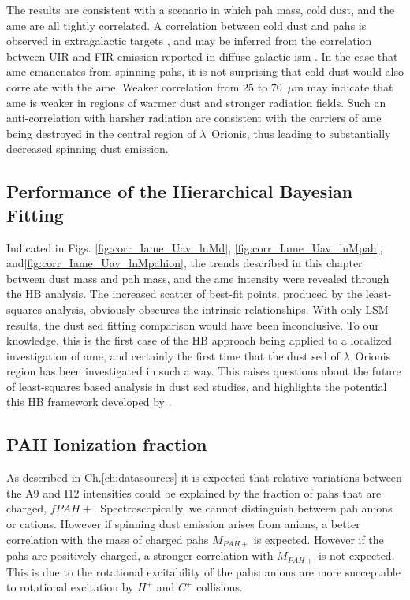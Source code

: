         The results are consistent with a scenario in which \acrshort{pah} mass, cold dust, and the \acrshort{ame} are all tightly correlated. A correlation between cold dust and \acrshort{pah}s is observed in extragalactic targets \citep{haas02}, and may be inferred from the correlation between UIR and FIR emission reported in diffuse galactic \acrshort{ism} \citep{onaka96}. In the case that \acrshort{ame} emanenates from spinning \acrshort{pah}s, it is not surprising that cold dust would also correlate with the \acrshort{ame}. Weaker correlation from 25 to 70~$\mu$m may indicate that \acrshort{ame} is weaker in regions of warmer dust and stronger radiation fields. Such an anti-correlation with harsher radiation are consistent with the carriers of \acrshort{ame} being destroyed in the central region of $\lambda$~Orionis, thus leading to substantially decreased spinning dust emission.

      \subsection{Performance of the Hierarchical Bayesian Fitting}

      Indicated in Figs. \ref{fig:corr_Iame_Uav_lnMd}, \ref{fig:corr_Iame_Uav_lnMpah}, and\ref{fig:corr_Iame_Uav_lnMpahion}, the trends described in this chapter between dust mass and \acrshort{pah} mass, and the \acrshort{ame} intensity were revealed through the HB analysis. The increased scatter of best-fit points, produced by the least-squares analysis, obviously obscures the intrinsic relationships. With only LSM results, the dust \acrshort{sed} fitting comparison would have been inconclusive. To our knowledge, this is the first case of the HB approach being applied to a localized investigation of \acrshort{ame}, and certainly the first time that the dust \acrshort{sed} of $\lambda$~Orionis region has been investigated in such a way. This raises questions about the future of least-squares based analysis in dust \acrshort{sed} studies, and highlights the potential this HB framework developed by \cite{galliano18}.

      \subsection{PAH Ionization fraction}
          As described in Ch.\ref{ch:datasources} it is expected that relative variations between the A9 and I12 intensities could be explained by the fraction of \acrshort{pah}s that are charged, $fPAH+$. Spectroscopically, we cannot distinguish between \acrshort{pah} anions or cations. However if spinning dust emission arises from anions, a better correlation with the mass of charged \acrshort{pah}s $M_{PAH+}$ is expected. However if the \acrshort{pah}s are positively charged, a stronger correlation with $M_{PAH+}$ is not expected. This is due to the rotational excitability of the \acrshort{pah}s: anions are more succeptable to rotational excitation by $H^{+}$ and $C^{+}$ collisions\citep{ali-haimoud10}.

